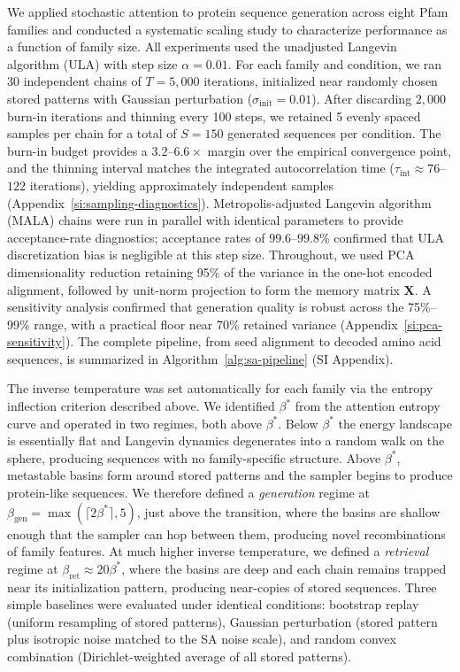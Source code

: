 
We applied stochastic attention to protein sequence generation across eight Pfam families and conducted a systematic scaling study to characterize performance as a function of family size. All experiments used the unadjusted Langevin algorithm (ULA) with step size $\alpha=0.01$. For each family and condition, we ran 30 independent chains of $T=5{,}000$ iterations, initialized near randomly chosen stored patterns with Gaussian perturbation ($\sigma_{\mathrm{init}}=0.01$). After discarding $2{,}000$ burn-in iterations and thinning every 100 steps, we retained 5 evenly spaced samples per chain for a total of $S=150$ generated sequences per condition. The burn-in budget provides a $3.2$--$6.6\times$ margin over the empirical convergence point, and the thinning interval matches the integrated autocorrelation time ($\tau_{\mathrm{int}} \approx 76$--$122$ iterations), yielding approximately independent samples (Appendix~\ref{si:sampling-diagnostics}). Metropolis-adjusted Langevin algorithm (MALA) chains were run in parallel with identical parameters to provide acceptance-rate diagnostics; acceptance rates of $99.6$--$99.8\%$ confirmed that ULA discretization bias is negligible at this step size. Throughout, we used PCA dimensionality reduction retaining 95\% of the variance in the one-hot encoded alignment, followed by unit-norm projection to form the memory matrix $\mathbf{X}$. A sensitivity analysis confirmed that generation quality is robust across the 75\%--99\% range, with a practical floor near 70\% retained variance (Appendix~\ref{si:pca-sensitivity}). The complete pipeline, from seed alignment to decoded amino acid sequences, is summarized in Algorithm~\ref{alg:sa-pipeline} (SI Appendix).

The inverse temperature was set automatically for each family via the entropy inflection criterion described above. We identified $\beta^*$ from the attention entropy curve and operated in two regimes, both above $\beta^*$. Below $\beta^*$ the energy landscape is essentially flat and Langevin dynamics degenerates into a random walk on the sphere, producing sequences with no family-specific structure. Above $\beta^*$, metastable basins form around stored patterns and the sampler begins to produce protein-like sequences. We therefore defined a \emph{generation} regime at $\beta_{\mathrm{gen}} = \max(\lceil 2\beta^* \rceil, 5)$, just above the transition, where the basins are shallow enough that the sampler can hop between them, producing novel recombinations of family features. At much higher inverse temperature, we defined a \emph{retrieval} regime at $\beta_{\mathrm{ret}} \approx 20\beta^*$, where the basins are deep and each chain remains trapped near its initialization pattern, producing near-copies of stored sequences. Three simple baselines were evaluated under identical conditions: bootstrap replay (uniform resampling of stored patterns), Gaussian perturbation (stored pattern plus isotropic noise matched to the SA noise scale), and random convex combination (Dirichlet-weighted average of all stored patterns).

